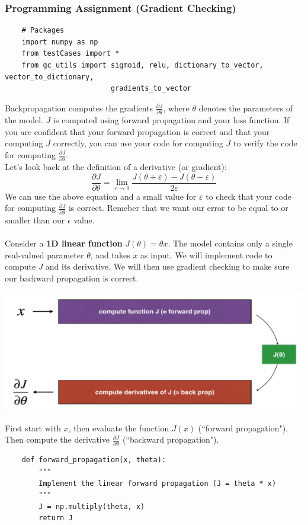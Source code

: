 \documentclass[11pt, a4paper]{article}
\begin{document}
\begin{spacing}{1.1}
	\subsubsection{Programming Assignment (Gradient Checking)}
	\begin{lstlisting}
	# Packages
	import numpy as np
	from testCases import *
	from gc_utils import sigmoid, relu, dictionary_to_vector, vector_to_dictionary, 
	                     gradients_to_vector \end{lstlisting} \vspace*{1mm}
	Backpropagation computes the gradients $\frac{\partial J}{\partial \theta}$, where $\theta$ denotes the parameters of the model. $J$ is computed using forward propagation and your loss function. If you are confident that your forward propagation is correct and that your computing $J$ correctly, you can use your code for computing $J$ to verify the code for computing $\frac{\partial J}{\partial \theta}$. \vspace*{1mm} \\
	Let's look back at the definition of a derivative (or gradient):
	$$ \frac{\partial J}{\partial \theta} = \lim_{\varepsilon \to 0} \frac{J(\theta + \varepsilon) - J(\theta - \varepsilon)}{2 \varepsilon}$$
	We can use the above equation and a small value for $\varepsilon$ to check that your code for computing $\frac{\partial J}{\partial \theta}$ is correct. Remeber that we want our error to be equal to or smaller than our $\epsilon$ value. \\~\\
	Consider a \textbf{1D linear function} $J(\theta) = \theta x$. The model contains only a single real-valued parameter $\theta$, and takes $x$ as input. We will implement code to compute \textit{J} and its derivative. We will then use gradient checking to make sure our backward propagation is correct. \vspace*{1mm} \\
	\begin{center} \includegraphics[scale=.5]{1d_grad_check} \\	\end{center}
	First start with $x$, then evaluate the function $J(x)$ (``forward propagation"). Then compute the derivative $\frac{\partial J}{\partial \theta}$ (``backward propagation"). 
	\begin{lstlisting}
	def forward_propagation(x, theta):
		"""
		Implement the linear forward propagation (J = theta * x)
		"""
		J = np.multiply(theta, x)		
		return J
	

\end{lstlisting}
\end{spacing}
\end{document}
